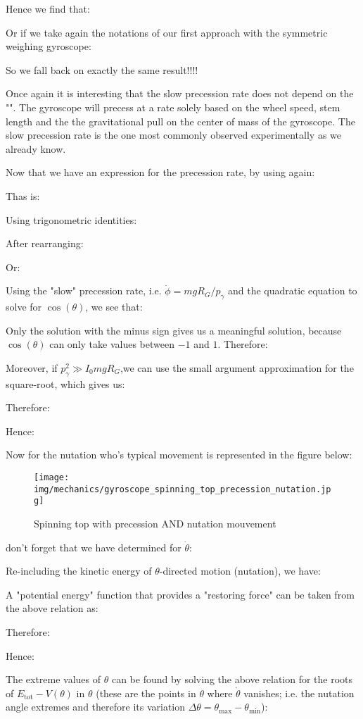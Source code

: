 	Hence we find that:
	
	Or if we take again the notations of our first approach with the symmetric weighing gyroscope:
	
	So we fall back on exactly the same result!!!!
	
	Once again it is interesting that the slow precession rate does not depend on the "". The gyroscope will precess at a rate solely based on the wheel speed, stem length and the the gravitational pull on the center of mass of the gyroscope. The slow precession rate is the one most commonly observed experimentally as we already know.
	
	Now that we have an expression for the precession rate, by using again:
	
	Thas is:
	
	Using trigonometric identities:
	
	After rearranging:
	
	Or:
	
	Using the "slow" precession rate, i.e. $\dot{\phi}=mgR_G/p_\gamma$ and the quadratic equation to solve for $\cos(\theta)$, we see that:
	
	Only the solution with the minus sign gives us a meaningful solution, because $\cos(\theta)$ can only take values between $-1$ and $1$. Therefore:
	
	Moreover, if $p_\gamma^2\gg I_0mgR_G$,we can use the small argument approximation for the square-root, which gives us:	
	
	Therefore:
	
	Hence:
	
	Now for the nutation who's typical movement is represented in the figure below:
	\begin{figure}[H]
		\centering
		\texttt{[image: img/mechanics/gyroscope\_spinning\_top\_precession\_nutation.jpg]}
		\caption[]{Spinning top with precession AND nutation mouvement}
	\end{figure}
	 don't forget that we have determined for $\dot{\theta}$:
	
	Re-including the kinetic energy of $\theta$-directed motion (nutation), we have:
	
	A "potential energy" function that provides a "restoring force" can be taken from the above relation as:
	
	Therefore:
	
	Hence:
	
	The extreme values of $\theta$ can be found by solving the above relation for the roots of $E_\text{tot}-V (\theta)$ in $\theta$ (these are the points in $\theta$ where $\dot{\theta}$ vanishes; i.e. the nutation angle extremes and therefore its variation $\Delta\theta=\theta_{\max}-\theta_{\min}$):
	
